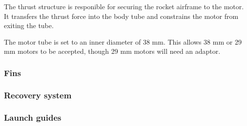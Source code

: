 \documentclass{article}
\begin{document}



The thrust structure is responible for securing the rocket airframe to the motor. 
It transfers the thrust force into the body tube 
and constrains the motor from exiting the tube.

The motor tube is set to an inner diameter of 38 mm. 
This allows 38 mm or 29 mm motors to be accepted, 
though 29 mm motors will need an adaptor.

\subsubsection{Fins}



\subsubsection{Recovery system}




\subsubsection{Launch guides}


\end{document}
